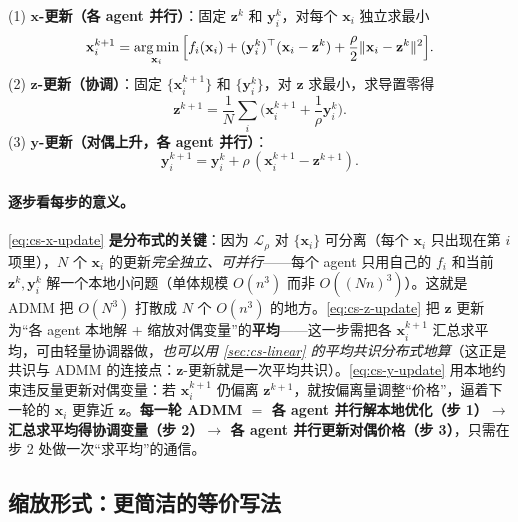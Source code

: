 \begin{algo}\label{alg:cs-admm}
(1) \textbf{$\mathbf{x}$-更新（各 agent 并行）}：固定 $\mathbf{z}^k$ 和 $\mathbf{y}_i^k$，对每个 $\mathbf{x}_i$ 独立求最小
\begin{equation}
  \mathbf{x}_i^{k+1}=\operatorname*{arg\,min}_{\mathbf{x}_i}\Big[f_i(\mathbf{x}_i)+(\mathbf{y}_i^k)^\top(\mathbf{x}_i-\mathbf{z}^k)+\frac{\rho}{2}\|\mathbf{x}_i-\mathbf{z}^k\|^2\Big].
  \label{eq:cs-x-update}
\end{equation}
(2) \textbf{$\mathbf{z}$-更新（协调）}：固定 $\{\mathbf{x}_i^{k+1}\}$ 和 $\{\mathbf{y}_i^k\}$，对 $\mathbf{z}$ 求最小，求导置零得
\begin{equation}
  \mathbf{z}^{k+1}=\frac1N\sum_i\Big(\mathbf{x}_i^{k+1}+\frac1\rho\mathbf{y}_i^k\Big).
  \label{eq:cs-z-update}
\end{equation}
(3) \textbf{$\mathbf{y}$-更新（对偶上升，各 agent 并行）}：
\begin{equation}
  \mathbf{y}_i^{k+1}=\mathbf{y}_i^k+\rho\,(\mathbf{x}_i^{k+1}-\mathbf{z}^{k+1}).
  \label{eq:cs-y-update}
\end{equation}
\end{algo}

\paragraph{逐步看每步的意义。}
\cref{eq:cs-x-update} \textbf{是分布式的关键}：因为 $\mathcal{L}_\rho$ 对 $\{\mathbf{x}_i\}$ 可分离（每个 $\mathbf{x}_i$ 只出现在第 $i$ 项里），$N$ 个 $\mathbf{x}_i$ 的更新\emph{完全独立、可并行}——每个 agent 只用自己的 $f_i$ 和当前 $\mathbf{z}^k,\mathbf{y}_i^k$ 解一个本地小问题（单体规模 $O(n^3)$ 而非 $O((Nn)^3)$）。这就是 ADMM 把 $O(N^3)$ 打散成 $N$ 个 $O(n^3)$ 的地方。\cref{eq:cs-z-update} 把 $\mathbf{z}$ 更新为“各 agent 本地解 + 缩放对偶变量”的\textbf{平均}——这一步需把各 $\mathbf{x}_i^{k+1}$ 汇总求平均，可由轻量协调器做，\emph{也可以用 \cref{sec:cs-linear} 的平均共识分布式地算}（这正是共识与 ADMM 的连接点：$\mathbf{z}$-更新就是一次平均共识）。\cref{eq:cs-y-update} 用本地约束违反量更新对偶变量：若 $\mathbf{x}_i^{k+1}$ 仍偏离 $\mathbf{z}^{k+1}$，就按偏离量调整“价格”，逼着下一轮的 $\mathbf{x}_i$ 更靠近 $\mathbf{z}$。\textbf{每一轮 ADMM $=$ 各 agent 并行解本地优化（步 1）$\to$ 汇总求平均得协调变量（步 2）$\to$ 各 agent 并行更新对偶价格（步 3）}，只需在步 2 处做一次“求平均”的通信。

\subsection{缩放形式：更简洁的等价写法}
\label{sec:cs-admm-scaled}

